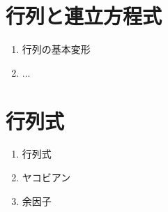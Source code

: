 \documentclass[../imaging-math]{subfiles}
\begin{document}
\section{行列と連立方程式}

\begin{mindflow}
  \begin{enumerate}
    \item 行列の基本変形
    \item ...
  \end{enumerate}
\end{mindflow}

\section{行列式}

\begin{mindflow}
  \begin{enumerate}
    \item 行列式
    \item ヤコビアン
    \item 余因子
  \end{enumerate}
\end{mindflow}
\end{document}
